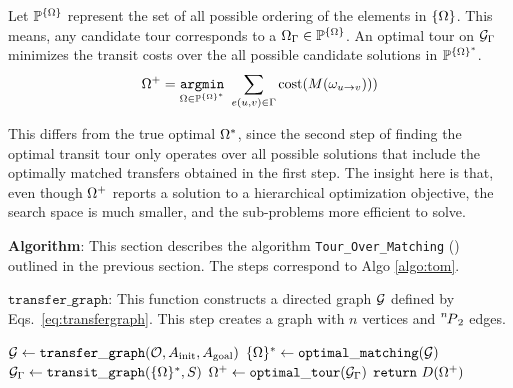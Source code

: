 Let $ \mathbb{P}^{\scomaset} $ represent the set of all possible ordering of the elements in $ \scomaset $. This means, any candidate tour corresponds to a $ \scoma_\tour\in\mathbb{P}^{\scomaset} $. An optimal tour on $ \tspgraph $ minimizes the transit costs over the all possible candidate solutions in  $ \mathbb{P}^{\scomaset^*} $.
\vspace{-0.1in}
\begin{equation}
\scoma^+ = \underset{ \scoma \in  \mathbb{P}^{\scomaset^*}   }{ \mathtt{argmin} } \ \sum_{e(u,v)\in\tour}\cost({M}( \coma_{u\rightarrow v} ))  )
\vspace{-0.05in}
\end{equation}

This differs from the true optimal $ \scoma^* $, since the second step of finding the optimal transit tour only operates over all possible solutions that include the optimally matched transfers obtained in the first step.
The insight here is that, even though $ \scoma^+ $ reports a solution to a hierarchical optimization objective, 
the search space is much smaller, and the sub-problems more efficient to solve.\\

\vspace{-0.1in}

\noindent\textbf{Algorithm}: This section describes the algorithm {\tt {Tour\_Over\_Matching}} (\algo) outlined in the previous section. The steps correspond to Algo \ref{algo:tom}. 

\noindent $ \mathtt{transfer\_graph} $: This function constructs a directed graph $ \graph $ defined by Eqs.~\ref{eq:transfergraph}. This step creates a graph with $ n $ vertices and $ \permu[n]{2} $ edges.

    \begin{algorithm}[t]
    \caption{{\tt \algo}$ (\objectset, \startq, \ainit, \atarget) $}
    \label{algo:tom}
    $ \graph \leftarrow \mathtt{transfer\_graph}(\objectset, \ainit, \atarget) $\;
    $ \scomaset^* \leftarrow \mathtt{optimal\_matching}(\graph) $\;
    $ \tspgraph \leftarrow \mathtt{transit\_graph}(\scomaset^*, \startq) $\;
    $ \scoma^+\leftarrow\mathtt{optimal\_tour}(\tspgraph) $\;
    $ \mathbf{\mathtt{return}}\ \trajset(\scoma^+)$\;
    \end{algorithm}

